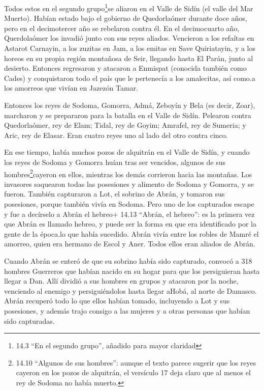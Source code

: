  Todos estos en el segundo grupo\footnote{14.3 ``En el
  segundo grupo'', añadido para mayor claridad}se aliaron en el Valle de
Sidín (el valle del Mar Muerto).  Habían estado bajo el
gobierno de Quedorlaómer durante doce años, pero en el decimotercer año
se rebelaron contra él.  En el decimocuarto año,
Querdolaómer los invadió junto con sus reyes aliados. Vencieron a los
refaítas en Astarot Carnayin, a los zuzitas en Jam, a los emitas en Save
Quiriatayin,  y a los horeos en su propia región montañosa
de Seir, llegando hasta El Parán, junto al desierto. 
Entonces regresaron y atacaron a Enmispat (conocida también como Cades)
y conquistaron todo el país que le pertenecía a los amalecitas, así
como.a los amorreos que vivían en Jazezón Tamar.

 Entonces los reyes de Sodoma, Gomorra, Admá, Zeboyín y Bela
(es decir, Zoar), marcharon y se prepararon para la batalla en el Valle
de Sidín.  Pelearon contra Quedorlaómer, rey de Elam; Tidal,
rey de Goyim; Amrafel, rey de Sumeria; y Aric, rey de Elasar. Eran
cuatro reyes uno al lado del otro contra cinco.

 En ese tiempo, había muchos pozos de alquitrán en el Valle
de Sidín, y cuando los reyes de Sodoma y Gomorra huían tras ser
vencidos, algunos de sus hombres\footnote{14.10 ``Algunos de sus
  hombres'': aunque el texto parece sugerir que los reyes cayeron en los
  pozos de alquitrán, el versículo 17 deja claro que al menos el rey de
  Sodoma no había muerto.}cayeron en ellos, mientras los demás corrieron
hacia las montañas.  Los invasores saquearon todas las
posesiones y alimento de Sodoma y Gomorra, y se fueron. 
También capturaron a Lot, el sobrino de Abrán, y tomaron sus posesiones,
porque también vivía en Sodoma.  Pero uno de los capturados
escape y fue a decírselo a Abrán el hebreo+ 14.13 ``Abrán, el hebreo'':
es la primera vez que Abrán es llamado hebreo, y puede ser la forma en
que era identificado por la gente de la época.lo que había sucedido.
Abrán vivía entre los robles de Mamré el amorreo, quien era hermano de
Escol y Aner. Todos ellos eran aliados de Abrán.

 Cuando Abrán se enteró de que su sobrino había sido
capturado, convocó a 318 hombres Guerreros que habían nacido en su hogar
para que los persiguieran hasta llegar a Dan.  Allí dividió
a sus hombres en grupos y atacaron por la noche, venciendo al enemigo y
persiguiéndolos hasta llegar aHobá, al norte de Damasco. 
Abrán recuperó todo lo que ellos habían tomado, incluyendo a Lot y sus
posesiones, y además trajo consigo a las mujeres y a otras personas que
habían sido capturadas.

